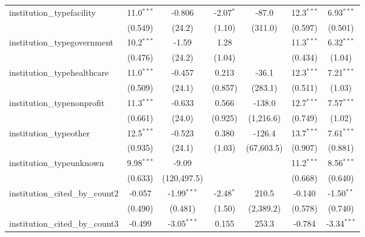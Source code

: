 \begin{tabular}{lcccccc}
   institution\_typefacility             & 11.0$^{***}$   & -0.806        & -2.07$^{*}$   & -87.0      & 12.3$^{***}$  & 6.93$^{***}$\\   
                                         & (0.549)        & (24.2)        & (1.10)        & (311.0)    & (0.597)       & (0.501)\\   
   institution\_typegovernment           & 10.2$^{***}$   & -1.59         & 1.28          &            & 11.3$^{***}$  & 6.32$^{***}$\\   
                                         & (0.476)        & (24.2)        & (1.04)        &            & (0.434)       & (1.04)\\   
   institution\_typehealthcare           & 11.0$^{***}$   & -0.457        & 0.213         & -36.1      & 12.3$^{***}$  & 7.21$^{***}$\\   
                                         & (0.509)        & (24.1)        & (0.857)       & (283.1)    & (0.511)       & (1.03)\\   
   institution\_typenonprofit            & 11.3$^{***}$   & -0.633        & 0.566         & -138.0     & 12.7$^{***}$  & 7.57$^{***}$\\   
                                         & (0.661)        & (24.0)        & (0.925)       & (1,216.6)  & (0.749)       & (1.02)\\   
   institution\_typeother                & 12.5$^{***}$   & -0.523        & 0.380         & -126.4     & 13.7$^{***}$  & 7.61$^{***}$\\   
                                         & (0.935)        & (24.1)        & (1.03)        & (67,603.5) & (0.907)       & (0.881)\\   
   institution\_typeunknown              & 9.98$^{***}$   & -9.09         &               &            & 11.2$^{***}$  & 8.56$^{***}$\\   
                                         & (0.633)        & (120,497.5)   &               &            & (0.668)       & (0.640)\\   
   institution\_cited\_by\_count2        & -0.057         & -1.99$^{***}$ & -2.48$^{*}$   & 210.5      & -0.140        & -1.50$^{**}$\\   
                                         & (0.490)        & (0.481)       & (1.50)        & (2,389.2)  & (0.578)       & (0.740)\\   
   institution\_cited\_by\_count3        & -0.499         & -3.05$^{***}$ & 0.155         & 253.3      & -0.784        & -3.34$^{***}$\\   

\end{tabular}

